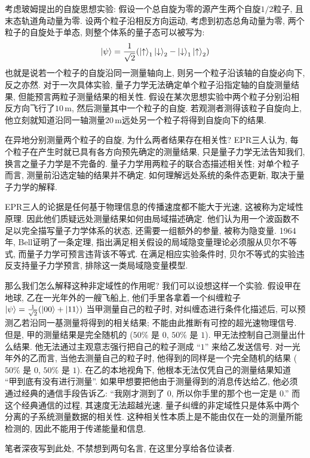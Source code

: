 考虑玻姆提出的自旋思想实验: 假设一个总自旋为零的源产生两个自旋$1/2$粒子, 且末态轨道角动量为零.
设两个粒子沿相反方向运动, 考虑到初态总角动量为零, 两个粒子的自旋处于单态, 则整个体系的量子态可以被写为:
\[
\ket{\psi} = \frac{1}{\sqrt{2}}(\ket{\uparrow}_1\ket{\downarrow}_2 - \ket{\downarrow}_1\ket{\uparrow}_2)
\]
也就是说若一个粒子的自旋沿同一测量轴向上, 则另一个粒子沿该轴的自旋必向下, 反之亦然. 对于一次具体实验, 量子力学无法确定单个粒子沿指定轴的自旋测量结果, 但能预言两粒子测量结果的相关性. 假设在某次思想实验中两个粒子分别沿相反方向飞行了$10\,\mathrm{m}$, 然后测量其中一个粒子的自旋. 若观测者测得该粒子自旋向上, 他立刻就知道沿同一轴测量$20\,\mathrm{m}$远处另一个粒子将得到自旋向下的结果.

在异地分别测量两个粒子的自旋, 为什么两者结果存在相关性? EPR三人认为, 每个粒子在产生时就已具有各方向预先确定的测量结果, 只是量子力学无法告知我们, 换言之量子力学是不完备的. 量子力学用两粒子的联合态描述相关性; 对单个粒子而言, 测量前沿选定轴的结果并不确定. 如何理解远处系统的条件态更新, 取决于量子力学的解释.

EPR三人的论据是任何基于物理信息的传播速度都不能大于光速, 这被称为定域性原理. 因此他们质疑远处测量结果如何由局域描述确定. 他们认为用一个波函数不足以完全描写量子力学体系的状态, 还需要一组额外的参量, 被称为隐变量. 1964年, Bell证明了一条定理, 指出满足相关假设的局域隐变量理论必须服从贝尔不等式, 而量子力学可预言违背该不等式. 在满足相应实验条件时, 贝尔不等式的实验违反支持量子力学预言, 排除这一类局域隐变量模型.

那么我们怎么解释这种非定域性的作用呢? 我们可以设想这样一个实验. 假设甲在地球, 乙在一光年外的一艘飞船上, 他们手里各拿着一个纠缠粒子$\ket{\psi} = \frac{1}{\sqrt{2}}(\ket{00} + \ket{11})$
当甲测量自己的粒子时, 对纠缠态进行条件化描述后, 可以预测乙若沿同一基测量将得到的相关结果; 不能由此推断有可控的超光速物理信号. 但是, 甲的测量结果是完全随机的 ($50\%$ 是 $0$, $50\%$ 是 $1$).
甲无法控制自己测量出什么结果. 他无法通过主观意志强行把自己的粒子测成 ``$1$'' 来给乙发送信号.
对一光年外的乙而言, 当他去测量自己的粒子时, 他得到的同样是一个完全随机的结果 ($50\%$ 是 $0$, $50\%$ 是 $1$). 在乙的本地视角下, 他根本无法仅凭自己的测量结果知道 ``甲到底有没有进行测量''.
如果甲想要把他由于测量得到的消息传达给乙, 他必须通过经典的通信手段告诉乙: ``我刚才测到了 $0$, 所以你手里的那个也一定是 $0$.'' 而这个经典通信的过程, 其速度无法超越光速. 量子纠缠的非定域性只是体系中两个分离的子系统测量数据的相关性. 这种相关性本质上是不能由仅在一处的测量所能检测的, 因此不能用于传递能量和信息.

笔者深夜写到此处, 不禁想到两句名言, 在这里分享给各位读者.

